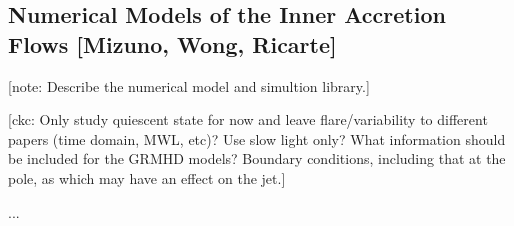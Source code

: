 \documentclass[twocolumn,tighten,dvipsnames,linenumbers]{aastex63}
\newcommand\note[1]{{\color{OliveGreen}[note: #1]}}
\newcommand\ckc[1]{{\color{MidnightBlue}[ckc: #1]}}
\begin{document}
\subsection{Numerical Models of the Inner Accretion Flows
  [Mizuno, Wong, Ricarte]}
\label{sec:numodels}

\note{Describe the numerical model and simultion library.}

\ckc{Only study quiescent state for now and leave flare/variability to
  different papers (time domain, MWL, etc)?
  Use slow light only?
  What information should be included for the GRMHD models?
  Boundary conditions, including that at the pole, as which may have
  an effect on the jet.}


...



\end{document}
